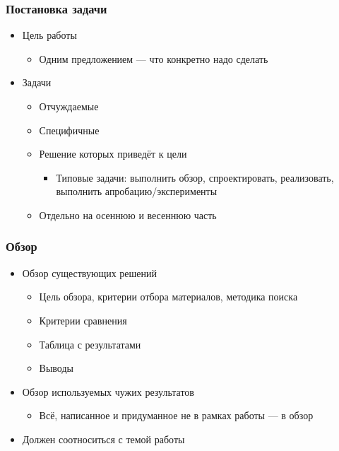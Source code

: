 \documentclass[xetex,mathserif,serif]{beamer}
\begin{document}
    \begin{frame}
        \frametitle{Постановка задачи}
        \begin{itemize}
            \item Цель работы
            \begin{itemize}
                \item Одним предложением --- что конкретно надо сделать
            \end{itemize}
            \item Задачи
            \begin{itemize}
                \item Отчуждаемые
                \item Специфичные
                \item Решение которых приведёт к цели
                \begin{itemize}
                    \item Типовые задачи: выполнить обзор, спроектировать, реализовать, выполнить апробацию/эксперименты
                \end{itemize}
                \item Отдельно на осеннюю и весеннюю часть
            \end{itemize}
        \end{itemize}
    \end{frame}

    \begin{frame}
        \frametitle{Обзор}
        \begin{itemize}
            \item Обзор существующих решений
            \begin{itemize}
                \item Цель обзора, критерии отбора материалов, методика поиска
                \item Критерии сравнения
                \item Таблица с результатами
                \item Выводы
            \end{itemize}
            \item Обзор используемых чужих результатов
            \begin{itemize}
                \item  Всё, написанное и придуманное не в рамках работы --- в обзор
            \end{itemize}
            \item Должен соотноситься с темой работы
        \end{itemize}
    \end{frame}
\end{document}
